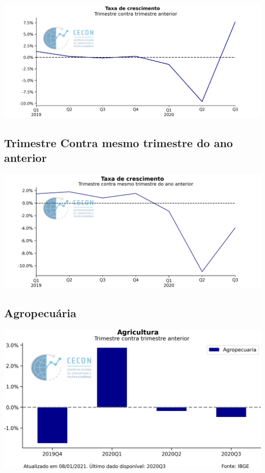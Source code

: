 \documentclass{SelfArx}
\begin{document}
\begin{center}
\includegraphics[width=.9\linewidth]{./figs/PIB/PIB.png}
\end{center}

\subsection*{Trimestre Contra mesmo trimestre do ano anterior}
\label{sec:org49242eb}

\begin{center}
\includegraphics[width=.9\linewidth]{./figs/PIB/PIB_YoY.png}
\end{center}

\subsection*{Agropecuária}
\label{sec:orgd67b872}

\begin{center}
\includegraphics[width=.9\linewidth]{./figs/PIB/Agropecuaria.png}
\end{center}
\end{document}
